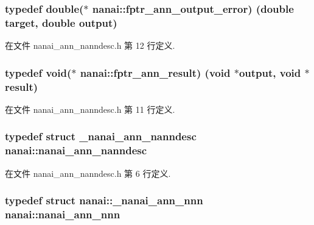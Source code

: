 \hypertarget{namespacenanai_a5e697a4846a90e7e161e1d2d5be57688}{}
\subsubsection[{fptr\+\_\+ann\+\_\+output\+\_\+error}]{\setlength{\rightskip}{0pt plus 5cm}typedef double($\ast$ nanai\+::fptr\+\_\+ann\+\_\+output\+\_\+error) (double target, double output)}\label{namespacenanai_a5e697a4846a90e7e161e1d2d5be57688}


在文件 nanai\+\_\+ann\+\_\+nanndesc.\+h 第 12 行定义.

\hypertarget{namespacenanai_ab737ac3c4f32f96a8ee6400db1c5a90f}{}
\subsubsection[{fptr\+\_\+ann\+\_\+result}]{\setlength{\rightskip}{0pt plus 5cm}typedef void($\ast$ nanai\+::fptr\+\_\+ann\+\_\+result) (void $\ast$output, void $\ast$result)}\label{namespacenanai_ab737ac3c4f32f96a8ee6400db1c5a90f}


在文件 nanai\+\_\+ann\+\_\+nanndesc.\+h 第 11 行定义.

\hypertarget{namespacenanai_a892a8c80381d0005a076b68fbbf2d918}{}
\subsubsection[{nanai\+\_\+ann\+\_\+nanndesc}]{\setlength{\rightskip}{0pt plus 5cm}typedef struct {\bf \+\_\+nanai\+\_\+ann\+\_\+nanndesc} {\bf nanai\+::nanai\+\_\+ann\+\_\+nanndesc}}\label{namespacenanai_a892a8c80381d0005a076b68fbbf2d918}


在文件 nanai\+\_\+ann\+\_\+nanndesc.\+h 第 6 行定义.

\hypertarget{namespacenanai_a2a6647c825fde0177764e042130b8b99}{}
\subsubsection[{nanai\+\_\+ann\+\_\+nnn}]{\setlength{\rightskip}{0pt plus 5cm}typedef struct {\bf nanai\+::\+\_\+nanai\+\_\+ann\+\_\+nnn}  {\bf nanai\+::nanai\+\_\+ann\+\_\+nnn}}\label{namespacenanai_a2a6647c825fde0177764e042130b8b99}


